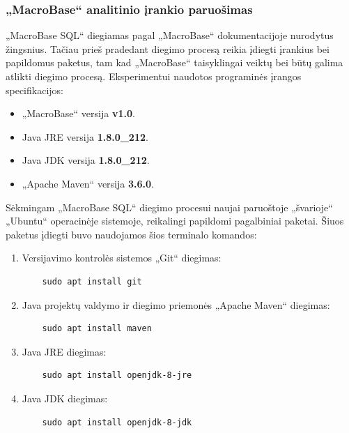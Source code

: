 \documentclass{VUMIFPSbakalaurinis}
\begin{document}
\subsubsection{„MacroBase“ analitinio įrankio paruošimas}
„MacroBase SQL“ diegiamas pagal „MacroBase“ dokumentacijoje nurodytus žingsnius. Tačiau prieš pradedant diegimo procesą reikia įdiegti įrankius bei papildomus paketus, tam kad „MacroBase“ taisyklingai veiktų bei būtų galima atlikti diegimo procesą. Eksperimentui naudotos programinės įrangos specifikacijos:
\begin{itemize}
	\item „MacroBase“ versija \textbf{v1.0}.
	\item Java JRE versija \textbf{1.8.0\_212}.
	\item Java JDK versija \textbf{1.8.0\_212}.
	\item „Apache Maven“ versija \textbf{3.6.0}.
\end{itemize}

Sėkmingam „MacroBase SQL“ diegimo procesui naujai paruoštoje „švarioje“ „Ubuntu“ operacinėje sistemoje, reikalingi papildomi pagalbiniai paketai. Šiuos paketus įdiegti buvo naudojamos šios terminalo komandos:
\begin{enumerate}
	\item Versijavimo kontrolės sistemos „Git“ diegimas:
	\begin{verbatim}
	sudo apt install git
	\end{verbatim}
	\item Java projektų valdymo ir diegimo priemonės „Apache Maven“ diegimas:
	\begin{verbatim}
	sudo apt install maven
	\end{verbatim}
	\item Java JRE diegimas:
	\begin{verbatim}
	sudo apt install openjdk-8-jre
	\end{verbatim}
	\item Java JDK diegimas:
	\begin{verbatim}
	sudo apt install openjdk-8-jdk
	\end{verbatim}
\end{enumerate}
\end{document}
